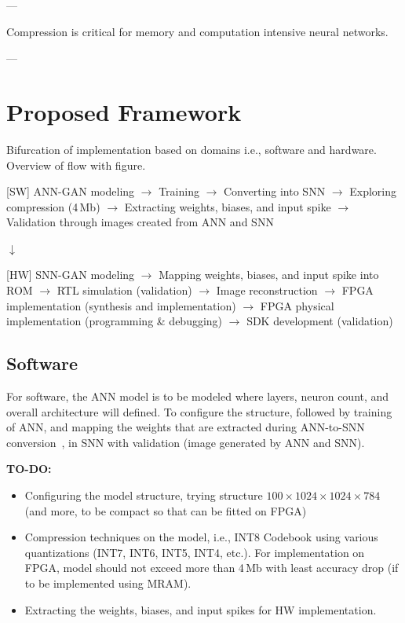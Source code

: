 \documentclass[conference]{IEEEtran}
\begin{document}
---

Compression is critical for memory and computation intensive neural networks.

---

\section{Proposed Framework} \label{sec:proposal}

Bifurcation of implementation based on domains i.e., software and hardware. Overview of flow with figure.

[SW] ANN-GAN modeling $\rightarrow$ Training $\rightarrow$ Converting into SNN $\rightarrow$ Exploring compression (4\,Mb) $\rightarrow$ Extracting weights, biases, and input spike $\rightarrow$ Validation through images created from ANN and SNN

$\downarrow$


[HW] SNN-GAN modeling $\rightarrow$ Mapping weights, biases, and input spike into ROM $\rightarrow$ RTL simulation (validation) $\rightarrow$ Image reconstruction $\rightarrow$ FPGA implementation (synthesis and implementation) $\rightarrow$ FPGA physical implementation (programming \& debugging) $\rightarrow$ SDK development (validation)

\subsection{Software}

For software, the ANN model is to be modeled where layers, neuron count, and overall architecture will defined. To configure the structure, followed by training of ANN, and mapping the weights that are extracted during ANN-to-SNN conversion~\cite{7280696}, in SNN with validation (image generated by ANN and SNN).

\textbf{TO-DO:}
\begin{itemize}
\item Configuring the model structure, trying structure $100\times1024\times1024\times784$ (and more, to be compact so that can be fitted on FPGA)
\item Compression techniques on the model, i.e., INT8 Codebook using various quantizations (INT7, INT6, INT5, INT4, etc.). For implementation on FPGA, model should not exceed more than 4\,Mb with least accuracy drop (if to be implemented using MRAM).
\item Extracting the weights, biases, and input spikes for HW implementation.
\end{itemize} 
\end{document}
